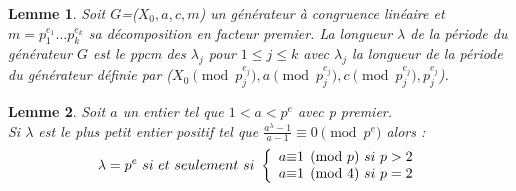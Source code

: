 \documentclass[a4paper,11pt]{report}
\newtheorem{lem}{Lemme}[section]
\begin{document}
	\begin{lem}\label{lem1}
	Soit $G$=($X_0, a, c, m$) un g\'en\'erateur \`a congruence lin\'eaire et $m=p_1^{e_1}\ldots p_k^{e_k}$ sa %
	d\'ecomposition en facteur premier.
	 La longueur $\lambda$ de la p\'eriode du g\'en\'erateur $G$ est le ppcm des $\lambda_j$ pour %
	 $1\leq j\leq k$ avec $\lambda_j$ la longueur de la p\'eriode du g\'en\'erateur d\'efinie par %
	 ($X_0 \pmod{p_j^{e_j}}, a\pmod{p_j^{e_j}}, c\pmod{p_j^{e_j}}, p_j^{e_j}$).	
	\end{lem}	
	\begin{lem}\label{lem2}
	Soit $a$ un entier tel que $1 < a < p^e$ avec p premier.\\
	Si $\lambda$ est le plus petit entier positif tel que $\frac{a^{\lambda}-1}{a-1}\equiv 0\pmod{p^e}$ alors :\\
	
	
	\[\lambda=p^e~si~et~seulement~si~ 
\left \{
\begin{array}{c @{\equiv} c}
    a & 1\pmod{p}~si~p>2 \\
    a & 1\pmod{4}~si~p=2 \\
\end{array}
\right.
\]	
	\end{lem}
	
\end{document}
